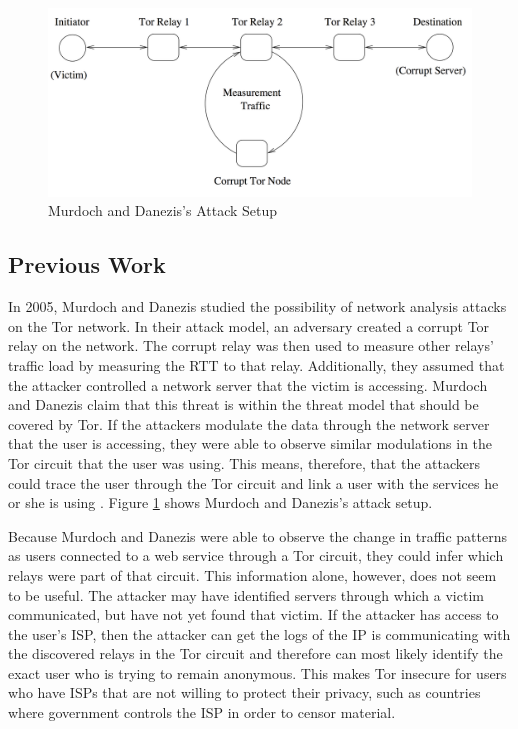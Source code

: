 \documentclass[12pt,journal]{IEEEtran}
\begin{document}
\begin{figure}

 \center
  \includegraphics[width=\textwidth]{figures/murdochattacksetup.png}
  \caption{Murdoch and Danezis's Attack Setup \cite{Murdoch:2005:LTA:1058433.1059390}}
  \label{murdochsetup}
\end{figure}

\subsection{Previous Work}
In 2005, Murdoch and Danezis studied the possibility of network analysis attacks on the Tor network. In their attack model, an adversary created a corrupt Tor relay on the network. The corrupt relay was then used to measure other relays' traffic load by measuring the RTT to that relay. Additionally, they assumed that the attacker controlled a network server that the victim is accessing. Murdoch and Danezis claim that this threat is within the threat model that should be covered by Tor. If the attackers modulate the data through the network server that the user is accessing, they were able to observe similar modulations in the Tor circuit that the user was using. This means, therefore, that the attackers could trace the user through the Tor circuit and link a user with the services he or she is using \cite{Murdoch:2005:LTA:1058433.1059390}. Figure \ref{murdochsetup} shows Murdoch and Danezis's attack setup.
\par
Because Murdoch and Danezis were able to observe the change in traffic patterns as users connected to a web service through a Tor circuit, they could infer which relays were part of that circuit. This information alone, however, does not seem to be useful. The attacker may have identified servers through which a victim communicated, but have not yet found that victim. If the attacker has access to the user's ISP, then the attacker can get the logs of the IP is communicating with the discovered relays in the Tor circuit and therefore can most likely identify the exact user who is trying to remain anonymous. This makes Tor insecure for users who have ISPs that are not willing to protect their privacy, such as countries where government controls the ISP in order to censor material.
\end{document}
